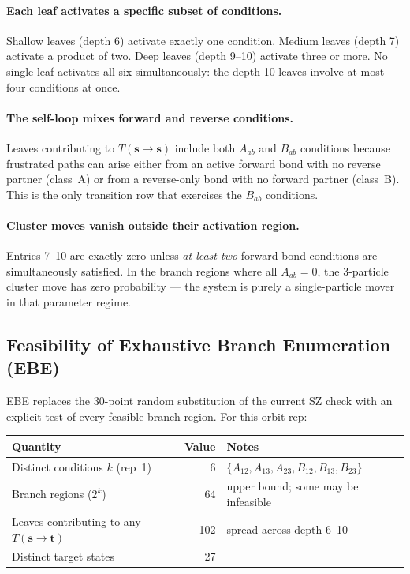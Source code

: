 \documentclass[11pt,a4paper]{article}
\newcommand{\s}{\mathbf{s}}
\newcommand{\tp}{\mathbf{t}}
\begin{document}
\paragraph{Each leaf activates a specific subset of conditions.}
Shallow leaves (depth 6) activate exactly one condition.  Medium leaves
(depth 7) activate a product of two.  Deep leaves (depth 9--10) activate
three or more.  No single leaf activates all six simultaneously: the
depth-10 leaves involve at most four conditions at once.

\paragraph{The self-loop mixes forward and reverse conditions.}
Leaves contributing to $T(\s\to\s)$ include both $A_{ab}$ and $B_{ab}$
conditions because frustrated paths can arise either from an active forward
bond with no reverse partner (class~A) or from a reverse-only bond with no
forward partner (class~B).  This is the only transition row that exercises
the $B_{ab}$ conditions.

\paragraph{Cluster moves vanish outside their activation region.}
Entries 7--10 are exactly zero unless \emph{at least two} forward-bond
conditions are simultaneously satisfied.  In the branch regions where all
$A_{ab}=0$, the 3-particle cluster move has zero probability --- the system
is purely a single-particle mover in that parameter regime.

\subsection{Feasibility of Exhaustive Branch Enumeration (EBE)}

EBE replaces the 30-point random substitution of the current SZ check with
an explicit test of every feasible branch region.  For this orbit rep:

\begin{center}
\begin{tabular}{lrl}
\toprule
Quantity & Value & Notes \\
\midrule
Distinct conditions $k$ (rep~1) & 6 & $\{A_{12},A_{13},A_{23},B_{12},B_{13},B_{23}\}$ \\
Branch regions ($2^k$) & 64 & upper bound; some may be infeasible \\
Leaves contributing to any $T(\s\to\tp)$ & 102 & spread across depth 6--10 \\
Distinct target states & 27 & \\
\bottomrule
\end{tabular}
\end{center}
\end{document}
